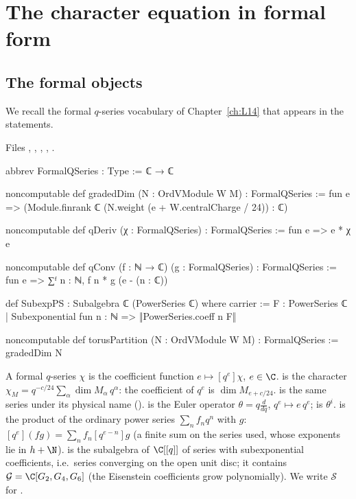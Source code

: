 \section{The character equation in formal form}\label{l16:sec:formal}

\subsection{The formal objects}

We recall the formal $q$-series vocabulary of Chapter~\ref{ch:L14} that appears in the statements.

\noindent Files ,
,
,
,
.
\begin{leancode}
abbrev FormalQSeries : Type := ℂ → ℂ

noncomputable def gradedDim (N : OrdVModule W M) : FormalQSeries :=
  fun e => (Module.finrank ℂ (N.weight (e + W.centralCharge / 24)) : ℂ)

noncomputable def qDeriv (χ : FormalQSeries) : FormalQSeries := fun e => e * χ e

noncomputable def qConv (f : ℕ → ℂ) (g : FormalQSeries) : FormalQSeries :=
  fun e => ∑ᶠ n : ℕ, f n * g (e - (n : ℂ))

def SubexpPS : Subalgebra ℂ (PowerSeries ℂ) where
  carrier := {F : PowerSeries ℂ | Subexponential fun n : ℕ => ‖PowerSeries.coeff n F‖}

noncomputable def torusPartition (N : OrdVModule W M) : FormalQSeries := gradedDim N
\end{leancode}

\begin{dictionary}
A formal $q$-series $\chi$ is the coefficient function $e\mapsto[q^e]\chi$, $e\in\C$.  is the
character $\chi_M = q^{-c/24}\sum_\alpha\dim M_\alpha\,q^\alpha$: the coefficient of $q^e$ is $\dim M_{e+c/24}$.
 is the same series under its physical name ().  is the Euler operator
$\theta = q\frac{d}{dq}$, $q^e\mapsto e\,q^e$;  is $\theta^i$.  is the product of the
ordinary power series $\sum_nf_nq^n$ with $g$: $[q^e](fg) = \sum_nf_n[q^{e-n}]g$ (a finite sum on the series used,
whose exponents lie in $h+\N$).  is the subalgebra of $\C[[q]]$ of series with subexponential
coefficients, i.e.\ series converging on the open unit disc; it contains $\mathcal G=\C[G_2,G_4,G_6]$ (the
Eisenstein coefficients grow polynomially). We write $\mathcal S$ for .
\end{dictionary}

